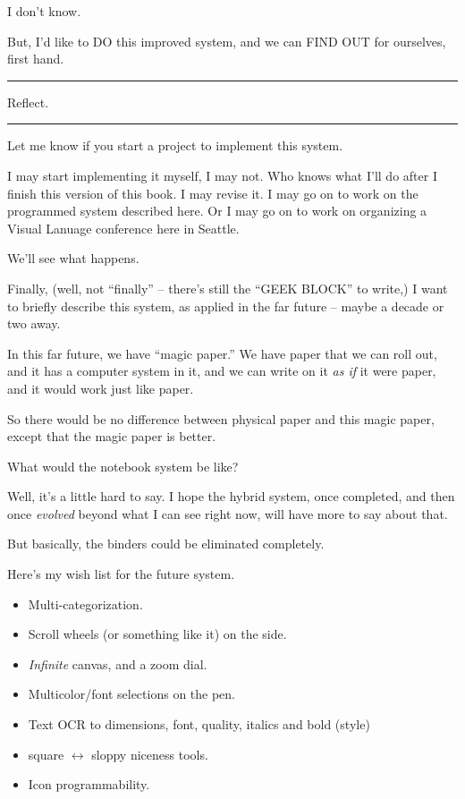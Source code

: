 \documentclass[oneside,fontsize=13]{scrbook}
\newcommand\pause{\bigskip\noindent}
\begin{document}
I don't know.

But, I'd like to DO this improved system, and we can FIND OUT for
ourselves, first hand.

\pause
\hrule

Reflect.

\hrule
\pause

Let me know if you start a project to implement this system.

I may start implementing it myself, I may not. Who knows what I'll do
after I finish this version of this book. I may revise it. I may go on
to work on the programmed system described here. Or I may go on to
work on organizing a Visual Lanuage conference here in Seattle.

We'll see what happens.

Finally, (well, not ``finally'' -- there's still the ``GEEK BLOCK'' to
write,) I want to briefly describe this system, as applied in the far
future -- maybe a decade or two away.

In this far future, we have ``magic paper.'' We have paper that we can
roll out, and it has a computer system in it, and we can write on it
\emph{as if} it were paper, and it would work just like paper.

So there would be no difference between physical paper and this magic
paper, except that the magic paper is better.

What would the notebook system be like?

Well, it's a little hard to say. I hope the hybrid system, once
completed, and then once \emph{evolved} beyond what I can see right now,
will have more to say about that.

But basically, the binders could be eliminated completely.

Here's my wish list for the future system.

\begin{itemize}
\item Multi-categorization.
\item Scroll wheels (or something like it) on the side.
\item \emph{Infinite} canvas, and a zoom dial.
\item Multicolor/font selections on the pen.
\item Text OCR to dimensions, font, quality, italics and bold (style)
\item square $\leftrightarrow$ sloppy niceness tools.
\item Icon programmability.
\end{itemize}
\end{document}
